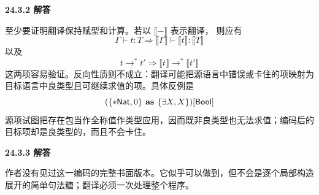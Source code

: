 \begin{taplauthorsolutionentrybox}
\label{sol:author:24.3.2}
\textbf{24.3.2 解答}

至少要证明翻译保持赋型和计算。若以 \(\llbracket-\rrbracket\) 表示翻译，
则应有
\[
\Gamma\vdash t:T
\Longrightarrow
\llbracket\Gamma\rrbracket\vdash
\llbracket t\rrbracket:\llbracket T\rrbracket
\]
以及
\[
t\longrightarrow^*t'
\Longrightarrow
\llbracket t\rrbracket\longrightarrow^*\llbracket t'\rrbracket
\]
这两项容易验证。反向性质则不成立：翻译可能把源语言中错误或卡住的项映射为
目标语言中良类型且可继续求值的项。具体反例是
\[
(\{*\mathsf{Nat},0\}\textbf{ as }\{\exists X,X\})[\mathsf{Bool}]
\]
源项试图把存在包当作全称值作类型应用，因而既非良类型也无法求值；编码后的
目标项却是良类型的，而且不会卡住。
\end{taplauthorsolutionentrybox}

\begin{taplauthorsolutionentrybox}
\label{sol:author:24.3.3}
\textbf{24.3.3 解答}

作者没有见过这一编码的完整书面版本。它似乎可以做到，但不会是逐个局部构造
展开的简单句法糖；翻译必须一次处理整个程序。
\end{taplauthorsolutionentrybox}
